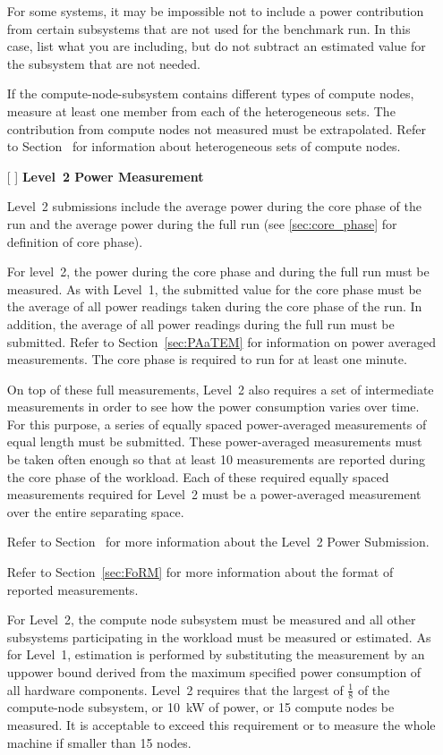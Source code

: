 \begin{itemize}
For some systems, it may be impossible not to include a power contribution from certain subsystems that are not used for the benchmark run.
In this case, list what you are including, but do not subtract an estimated value for the subsystem that are not needed.

If the compute-node-subsystem contains different types of compute nodes, measure at least one member from each of the heterogeneous sets. The contribution from compute nodes not measured must be extrapolated. Refer to 
Section~ for information about heterogeneous sets of compute nodes.

\newpage
\item[{[ ]}]
\textbf{Level~2 Power Measurement}

Level~2 submissions include the average power during the core phase of the run and the average power during the full run (see \ref{sec:core_phase} for definition of core phase).

For level~2, the power during the core phase and during the full run must be measured.
As with Level~1, the submitted value for the core phase must be the average of all power readings taken during the core phase of the run.
In addition, the average of all power readings during the full run must be submitted.
Refer to Section~\ref{sec:PAaTEM} for information on power averaged measurements.
The core phase is required to run for at least one minute.

On top of these full measurements, Level~2 also requires a set of intermediate measurements in order to see how the power consumption varies over time.
For this purpose, a series of equally spaced power-averaged measurements of equal length must be submitted.
These power-averaged measurements must be taken often enough so that at least 10 measurements are reported during the core phase of the workload.
Each of these required equally spaced measurements required for Level~2 must be a power-averaged measurement over the entire separating space. 

Refer to Section~ for more information about the Level~2 Power Submission. 

Refer to Section~\ref{sec:FoRM} for more information about the format of reported measurements.

For Level~2, the compute node subsystem must be measured and all other subsystems participating in the workload must be measured or estimated.
As for Level~1, estimation is performed by substituting the measurement by an uppower bound derived from the maximum specified power consumption of all hardware components.
Level~2 requires that the largest of $\frac{1}{8}$ of the compute-node subsystem, or 10~kW of power, or 15 compute nodes be measured.
It is acceptable to exceed this requirement or to measure the whole machine if smaller than 15 nodes.


\end{itemize}
